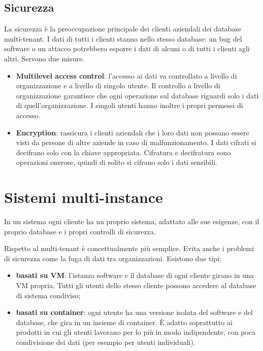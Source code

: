 \subsection{Sicurezza}

La sicurezza è la preoccupazione principale dei clienti aziendali dei database multi-tenant. I dati di tutti i clienti
stanno nello stesso database: un bug del software o un attacco potrebbero esporre i dati di alcuni o di tutti i clienti
agli altri. Servono due misure.

\begin{itemize}
  \item \textbf{Multilevel access control}: l'accesso ai dati va controllato a livello di organizzazione e a livello di
    singolo utente. Il controllo a livello di organizzazione garantisce che ogni operazione sul database riguardi solo i
    dati di quell'organizzazione. I singoli utenti hanno inoltre i propri permessi di accesso.
  \item \textbf{Encryption}: rassicura i clienti aziendali che i loro dati non possano essere visti da persone di altre
    aziende in caso di malfunzionamento. I dati cifrati si decifrano solo con la chiave appropriata. Cifratura e
    decifratura sono operazioni onerose, quindi di solito si cifrano solo i dati sensibili.
\end{itemize}

\section{Sistemi multi-instance}
\label{sec:cloud-multiistanza}

\begin{definizione}
In un sistema  ogni cliente ha un proprio sistema, adattato alle sue esigenze, con il proprio
database e i propri controlli di sicurezza.
\end{definizione}

Rispetto al multi-tenant è concettualmente più semplice. Evita anche i problemi di sicurezza come la fuga di dati tra
organizzazioni. Esistono due tipi:

\begin{itemize}
  \item \textbf{basati su VM}: l'istanza software e il database di ogni cliente girano in una VM propria. Tutti gli
    utenti dello stesso cliente possono accedere al database di sistema condiviso;
  \item \textbf{basati su container}: ogni utente ha una versione isolata del software e del database, che gira in un
    insieme di container. È adatto soprattutto ai prodotti in cui gli utenti lavorano per lo più in modo indipendente,
    con poca condivisione dei dati (per esempio per utenti individuali).
\end{itemize}

